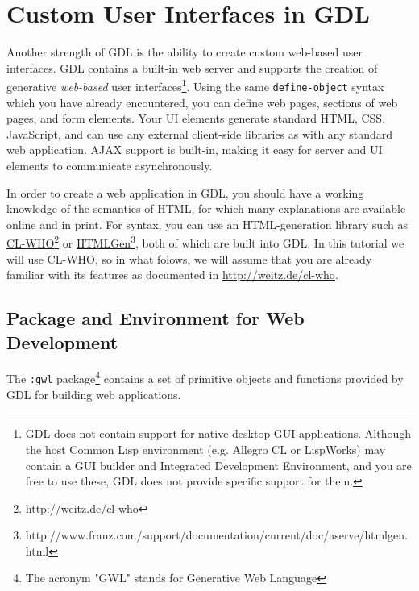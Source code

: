 \documentclass [11pt]{book}
\begin{document}
\chapter{Custom User Interfaces in GDL}

\label{chap:customuserinterfacesingdl}



Another strength of GDL is the ability to create custom
web-based user interfaces. GDL contains a built-in web server and
supports the creation of generative \emph{web-based} user interfaces\footnote{GDL does not contain support for native desktop
GUI applications. Although the host Common Lisp
environment (e.g. Allegro CL or LispWorks) may contain a GUI builder
and Integrated Development Environment, and you are free to use these,
GDL does not provide specific support for them.}. Using the same \texttt{define-object} syntax which you have already encountered, you can define
web pages, sections of web pages, and form elements.
Your UI elements generate standard HTML, CSS, JavaScript, and can use
any external client-side libraries as with any standard web application.  AJAX support is
built-in, making it easy for server and UI elements to communicate asynchronously.



In order to create a web application in GDL, you should have a working
knowledge of the semantics of HTML, for which many explanations are available
online and in print.  For syntax, you can use an HTML-generation library such as \href{http://weitz.de/cl-who}{CL-WHO}\footnote{http://weitz.de/cl-who} or \href{http://www.franz.com/support/documentation/current/doc/aserve/htmlgen.html}{HTMLGen}\footnote{http://www.franz.com/support/documentation/current/doc/aserve/htmlgen.html}, both of which are built into GDL.  In this tutorial we will use CL-WHO, so in what folows,
we will assume that you are already familiar with its features as documented in \href{http://weitz.de/cl-who}{http://weitz.de/cl-who}.



\section{Package and Environment for Web Development}

\label{sec:packageandenvironmentforwebdevelopment}



The \texttt{:gwl} package\footnote{The acronym "GWL" stands
for Generative Web Language} contains a set of primitive objects and functions provided by
GDL for building web applications.
\end{document}
